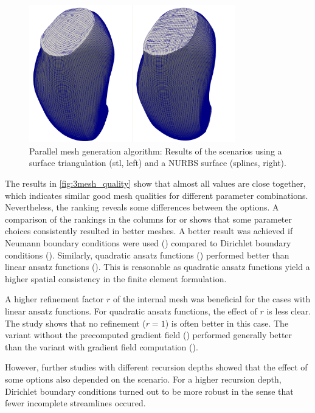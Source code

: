 \begin{figure}%
  \centering%
  \includegraphics[width=0.8\textwidth]{images/parallel_fiber_estimation/stl_splines_results.png}%
  \caption{Parallel mesh generation algorithm: Results of the scenarios using a surface triangulation (stl, left) and a NURBS surface (splines, right).}%
  \label{fig:stl_splines_results}%
\end{figure}%

The results in \cref{fig:3mesh_quality} show that almost all values are close together, which indicates similar good mesh qualities for different parameter combinations.
Nevertheless, the ranking reveals some differences between the options. 
A comparison of the rankings in the columns for  or  shows that some parameter choices consistently resulted in better meshes. 
A better result was achieved if Neumann boundary conditions were used () compared to Dirichlet boundary conditions (). 
Similarly, quadratic ansatz functions () performed better than linear ansatz functions (\say{$\ell$}). This is reasonable as quadratic ansatz functions yield a higher spatial consistency in the finite element formulation. 

A higher refinement factor $r$ of the internal mesh was beneficial for the cases with linear ansatz functions. For quadratic ansatz functions, the effect of $r$ is less clear. The study shows that no refinement ($r=1$) is often better in this case.
The variant without the precomputed gradient field () performed generally better than the variant with gradient field computation ().

However, further studies with different recursion depths showed that the effect of some options also depended on the scenario. For a higher recursion depth, Dirichlet boundary conditions turned out to be more robust in the sense that fewer incomplete streamlines occured.

